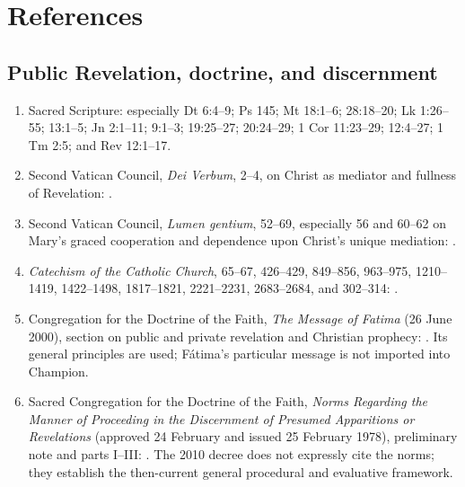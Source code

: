 \section{References}

\begingroup
\footnotesize
\linespread{0.98}\selectfont
\setlength{\parskip}{0pt}

\subsection{Public Revelation, doctrine, and discernment}

\begin{enumerate}
  \item Sacred Scripture: especially Dt 6:4--9; Ps 145; Mt 18:1--6; 28:18--20; Lk 1:26--55; 13:1--5; Jn 2:1--11; 9:1--3; 19:25--27; 20:24--29; 1 Cor 11:23--29; 12:4--27; 1 Tm 2:5; and Rev 12:1--17.
  \item Second Vatican Council, \emph{Dei Verbum}, 2--4, on Christ as mediator and fullness of Revelation: .
  \item Second Vatican Council, \emph{Lumen gentium}, 52--69, especially 56 and 60--62 on Mary's graced cooperation and dependence upon Christ's unique mediation: .
  \item \emph{Catechism of the Catholic Church}, 65--67, 426--429, 849--856, 963--975, 1210--1419, 1422--1498, 1817--1821, 2221--2231, 2683--2684, and 302--314: .
  \item Congregation for the Doctrine of the Faith, \emph{The Message of Fatima} (26 June 2000), section on public and private revelation and Christian prophecy: . Its general principles are used; Fátima's particular message is not imported into Champion.
  \item Sacred Congregation for the Doctrine of the Faith, \emph{Norms Regarding the Manner of Proceeding in the Discernment of Presumed Apparitions or Revelations} (approved 24 February and issued 25 February 1978), preliminary note and parts I--III: . The 2010 decree does not expressly cite the norms; they establish the then-current general procedural and evaluative framework.

\end{enumerate}
